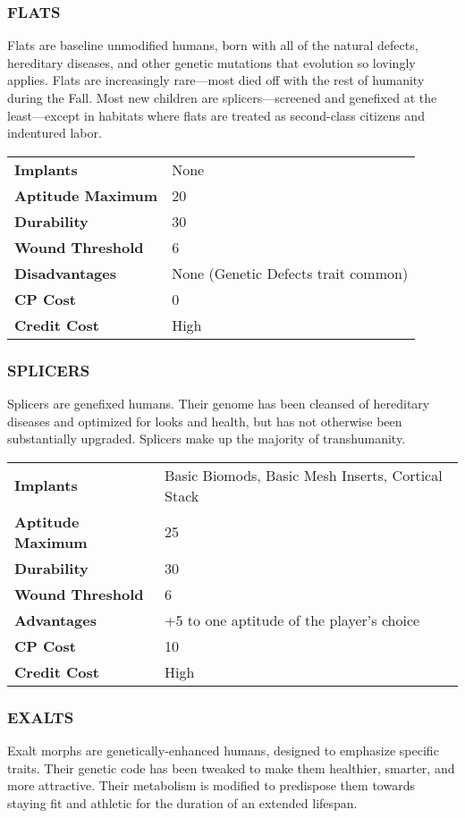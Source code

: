 \subsubsection{FLATS}
Flats are baseline unmodified humans, born with all of the natural defects,
hereditary diseases, and other genetic mutations that evolution so lovingly
applies.  Flats are increasingly rare—most died off with the rest of humanity
during the Fall. Most new children are splicers—screened and genefixed at the
least—except in habitats where flats are treated as second-class citizens and
indentured labor.

\begin{tabular}{>{\bfseries}ll}
  Implants &  None \\
  Aptitude Maximum &  20 \\
  Durability &  30 \\
  Wound Threshold &  6 \\
  Disadvantages &  None (Genetic Defects trait common) \\
  CP Cost &  0 \\
  Credit Cost &  High
\end{tabular}

\subsubsection{SPLICERS}
Splicers are genefixed humans. Their genome has been cleansed of hereditary
diseases and optimized for looks and health, but has not otherwise been
substantially upgraded. Splicers make up the majority of transhumanity.

\begin{tabular}{>{\bfseries}ll}
  Implants &  Basic Biomods, Basic Mesh Inserts, Cortical Stack\\
  Aptitude Maximum &  25 \\
  Durability &  30 \\
  Wound Threshold &  6 \\
  Advantages &  +5 to one aptitude of the player’s choice \\
  CP Cost &  10 \\
  Credit Cost &  High
\end{tabular}

\subsubsection{EXALTS}
Exalt morphs are genetically-enhanced humans, designed to emphasize specific
traits. Their genetic code has been tweaked to make them healthier, smarter,
and more attractive. Their metabolism is modified to predispose them towards
staying fit and athletic for the duration of an extended lifespan.

